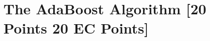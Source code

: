 \problem[2]
\begin{solution}
\end{solution}

\problem[3]
\begin{solution}
\end{solution}

\problem[5]
\begin{solution}
\end{solution}

\problem[7 EC]
\begin{solution}
\end{solution}

\problem[2 EC]
\begin{solution}
\end{solution}

\problem[1 EC]
\begin{solution}
\end{solution}



\newpage
\section{The AdaBoost Algorithm [20 Points 20 EC Points]}

\problem[3 EC]
\begin{solution}
\end{solution}

\problem[3 EC]
\begin{solution}
\end{solution}

\problem[2 EC]
\begin{solution}
\end{solution}

\problem[5 EC]
\begin{solution}
\end{solution}

\problem[5 EC]
\begin{solution}
\end{solution}

\problem[2 EC]
\begin{solution}
\end{solution}

\problem[14]
\begin{solution}
\end{solution}

\problem[2]
\begin{solution}
\end{solution}

\problem[2]
\begin{solution}
\end{solution}

\problem[2]
\begin{solution}
\end{solution}

